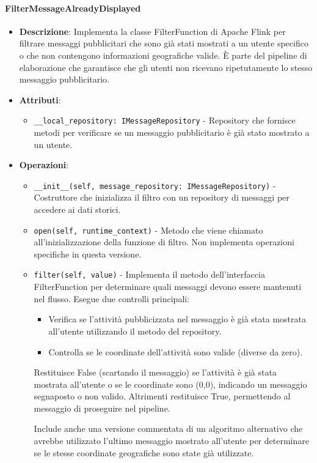 \documentclass[10pt]{article}
\begin{document}
    \paragraph{FilterMessageAlreadyDisplayed}
    \begin{itemize} 
    \item \textbf{Descrizione}: Implementa la classe FilterFunction di Apache Flink per filtrare messaggi pubblicitari che sono già stati mostrati a un utente specifico o che non contengono informazioni geografiche valide. È parte del pipeline di elaborazione che garantisce che gli utenti non ricevano ripetutamente lo stesso messaggio pubblicitario.
    \item \textbf{Attributi}:
    \begin{itemize}
        \item \texttt{\_\_local\_repository: IMessageRepository} - Repository che fornisce metodi per verificare se un messaggio pubblicitario è già stato mostrato a un utente.
    \end{itemize}
    
    \item \textbf{Operazioni}:
    \begin{itemize}
        \item \texttt{\_\_init\_\_(self, message\_repository: IMessageRepository)} - Costruttore che inizializza il filtro con un repository di messaggi per accedere ai dati storici.
        
        \item \texttt{open(self, runtime\_context)} - Metodo che viene chiamato all'inizializzazione della funzione di filtro. Non implementa operazioni specifiche in questa versione.
        
        \item \texttt{filter(self, value)} - Implementa il metodo dell'interfaccia FilterFunction per determinare quali messaggi devono essere mantenuti nel flusso. Esegue due controlli principali:
        \begin{itemize}
            \item Verifica se l'attività pubblicizzata nel messaggio è già stata mostrata all'utente utilizzando il metodo del repository.
            \item Controlla se le coordinate dell'attività sono valide (diverse da zero).
        \end{itemize}
        Restituisce False (scartando il messaggio) se l'attività è già stata mostrata all'utente o se le coordinate sono (0,0), indicando un messaggio segnaposto o non valido. Altrimenti restituisce True, permettendo al messaggio di proseguire nel pipeline.
        
        Include anche una versione commentata di un algoritmo alternativo che avrebbe utilizzato l'ultimo messaggio mostrato all'utente per determinare se le stesse coordinate geografiche sono state già utilizzate.
    \end{itemize}
    \end{itemize}
\end{document}
